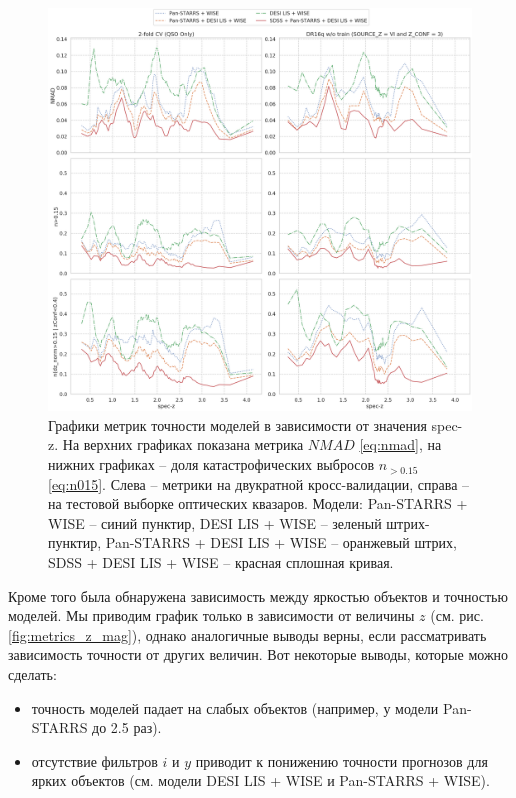 \documentclass[fleqn,usenatbib]{mnras}
\begin{document}
\begin{figure}[ht]
    \centering
    \includegraphics[width=0.9\linewidth]{images/metrics_spec-z.png}
    \caption{Графики метрик точности моделей в зависимости от значения spec-z. На верхних графиках показана метрика $NMAD$ \eqref{eq:nmad}, на нижних графиках -- доля катастрофических выбросов $n_{>0.15}$ \eqref{eq:n015}. Слева -- метрики на двукратной кросс-валидации, справа -- на тестовой выборке оптических квазаров. Модели: Pan-STARRS + WISE -- синий пунктир, DESI LIS + WISE -- зеленый штрих-пунктир, Pan-STARRS + DESI LIS + WISE -- оранжевый штрих, SDSS + DESI LIS + WISE -- красная сплошная кривая.}
    \label{fig:metrics_spec-z}
\end{figure}

Кроме того была обнаружена зависимость между яркостью объектов и точностью моделей. Мы приводим график только в зависимости от величины $z$ (см. рис. \ref{fig:metrics_z_mag}), однако аналогичные выводы верны, если рассматривать зависимость точности от других величин. Вот некоторые выводы, которые можно сделать:
\begin{itemize}
    \item точность моделей падает на слабых объектов (например, у модели Pan-STARRS до 2.5 раз).
    \item отсутствие фильтров $i$ и $y$ приводит к понижению точности прогнозов для ярких объектов (см. модели DESI LIS + WISE и Pan-STARRS + WISE).
\end{itemize}
\end{document}
